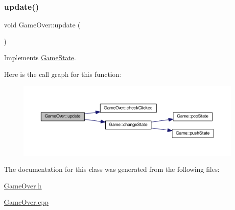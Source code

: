 \mbox{\label{class_game_over_a69f9e1364ff7caa8b17184441474c8b7}} 
\subsubsection{\texorpdfstring{update()}{update()}}
{\footnotesize\ttfamily void Game\+Over\+::update (\begin{DoxyParamCaption}{ }\end{DoxyParamCaption})\hspace{0.3cm}{\ttfamily [virtual]}}



Implements \hyperlink{class_game_state_ab2864bfa04f92f6966861a1f2883bda0}{Game\+State}.

Here is the call graph for this function\+:
\nopagebreak
\begin{figure}[H]
\begin{center}
\leavevmode
\includegraphics[width=350pt]{class_game_over_a69f9e1364ff7caa8b17184441474c8b7_cgraph}
\end{center}
\end{figure}


The documentation for this class was generated from the following files\+:\begin{DoxyCompactItemize}
\item 
\hyperlink{_game_over_8h}{Game\+Over.\+h}\item 
\hyperlink{_game_over_8cpp}{Game\+Over.\+cpp}\end{DoxyCompactItemize}
